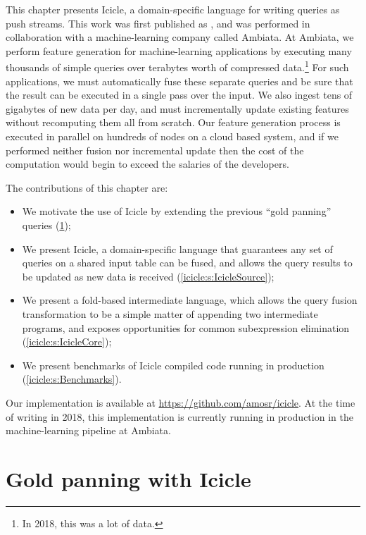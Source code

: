 \label{icicle:s:Introduction}

This chapter presents Icicle, a domain-specific language for writing queries as push streams.
This work was first published as \citet{robinson2016icicle}, and was performed in collaboration with a machine-learning company called Ambiata.
At Ambiata, we perform feature generation for machine-learning applications by executing many thousands of simple queries over terabytes worth of compressed data.\footnote{In 2018, this was a lot of data.}
For such applications, we must automatically fuse these separate queries and be sure that the result can be executed in a single pass over the input.
We also ingest tens of gigabytes of new data per day, and must incrementally update existing features without recomputing them all from scratch.
Our feature generation process is executed in parallel on hundreds of nodes on a cloud based system, and if we performed neither fusion nor incremental update then the cost of the computation would begin to exceed the salaries of the developers.

The contributions of this chapter are:
\begin{itemize}
\item
  We motivate the use of Icicle by extending the previous ``gold panning'' queries (\cref{icicle/gold-panning});

\item
  We present Icicle, a domain-specific language that guarantees any set of queries on a shared input table can be fused, and allows the query results to be updated as new data is received (\cref{icicle:s:IcicleSource});

\item
  We present a fold-based intermediate language, which allows the query fusion transformation to be a simple matter of appending two intermediate programs, and exposes opportunities for common subexpression elimination (\cref{icicle:s:IcicleCore});

\item
  We present benchmarks of Icicle compiled code running in production (\cref{icicle:s:Benchmarks}). 
\end{itemize}

Our implementation is available at \url{https://github.com/amosr/icicle}.
At the time of writing in 2018, this implementation is currently running in production in the machine-learning pipeline at Ambiata.

\section{Gold panning with Icicle}
\label{icicle/gold-panning}

